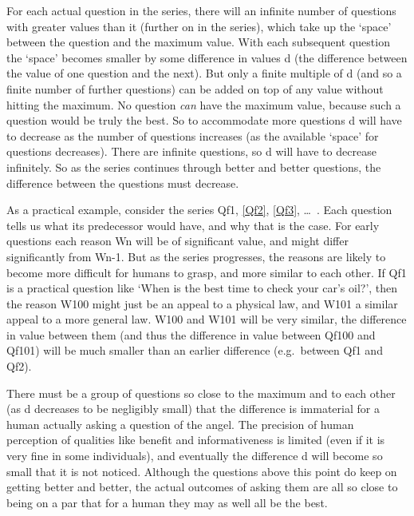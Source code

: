 For each actual question in the series, there will an infinite number of questions with greater values than it (further on in the series), which take up the `space' between the question and the maximum value.
With each subsequent question the `space' becomes smaller by some difference in values d (the difference between the value of one question and the next).
But only a finite multiple of d (and so a finite number of further questions) can be added on top of any value without hitting the maximum.
No question \emph{can} have the maximum value, because such a question would be truly the best.
So to accommodate more questions d will have to decrease as the number of questions increases (as the available `space' for questions decreases).
There are infinite questions, so d will have to decrease infinitely.
So as the series continues through better and better questions, the difference between the questions must decrease.

As a practical example, consider the series Qf1, \ref{Qf2}, \ref{Qf3}, \ldots\ .
Each question tells us what its predecessor would have, and why that is the case.
For early questions each reason Wn will be of significant value, and might differ significantly from Wn-1.
But as the series progresses, the reasons are likely to become more difficult for humans to grasp, and more similar to each other.
If Qf1 is a practical question like `When is the best time to check your car's oil?', then the reason W100 might just be an appeal to a physical law, and W101 a similar appeal to a more general law.
W100 and W101 will be very similar, the difference in value between them (and thus the difference in value between Qf100 and Qf101) will be much smaller than an earlier difference (e.g.\ between Qf1 and Qf2).

There must be a group of questions so close to the maximum and to each other (as d decreases to be negligibly small) that the difference is immaterial for a human actually asking a question of the angel.
The precision of human perception of qualities like benefit and informativeness is limited (even if it is very fine in some individuals), and eventually the difference d will become so small that it is not noticed.
Although the questions above this point do keep on getting better and better, the actual outcomes of asking them are all so close to being on a par that for a human they may as well all be the best.

